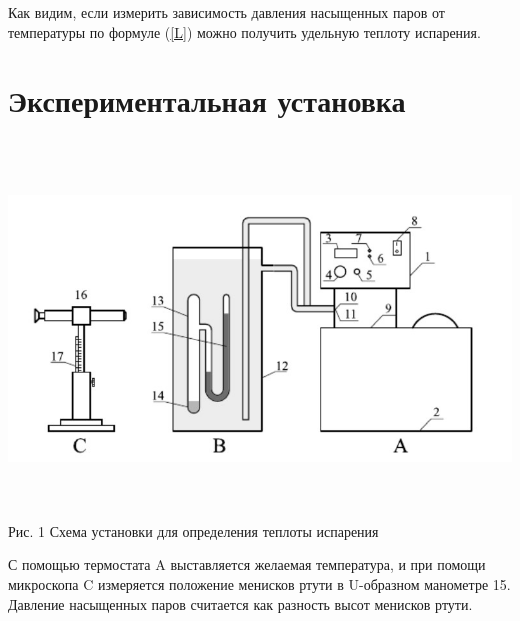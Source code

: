 \documentclass[a4paper, 12pt]{article}
\begin{document}
	Как видим, если измерить зависимость давления насыщенных паров от температуры по формуле (\ref{L}) можно получить удельную теплоту испарения.
	
	\section{Экспериментальная установка}
	\begin{center}
		\includegraphics[width=15cm, height=10cm]{"Screenshot_4.jpg"}\\
		Рис. 1 Схема установки для определения теплоты испарения\\
	\end{center}
 С помощью термостата A выставляется желаемая температура, и при помощи микроскопа C измеряется положение менисков ртути в U-образном манометре 15. Давление насыщенных паров считается как разность высот менисков ртути.
\end{document}
